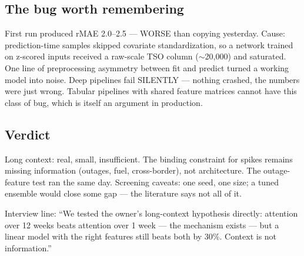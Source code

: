 \subsection{The bug worth remembering}

First run produced rMAE 2.0--2.5 --- WORSE than copying yesterday. Cause:
prediction-time samples skipped covariate standardization, so a network
trained on z-scored inputs received a raw-scale TSO column ($\sim$20{,}000)
and saturated. One line of preprocessing asymmetry between fit and
predict turned a working model into noise. Deep pipelines fail SILENTLY
--- nothing crashed, the numbers were just wrong. Tabular pipelines with
shared feature matrices cannot have this class of bug, which is itself
an argument in production.

\subsection{Verdict}

Long context: real, small, insufficient. The binding constraint for
spikes remains missing information (outages, fuel, cross-border), not
architecture. The outage-feature test ran the same day. Screening
caveats: one seed, one size; a tuned ensemble would close some gap ---
the literature says not all of it.

Interview line: ``We tested the owner's long-context hypothesis
directly: attention over 12 weeks beats attention over 1 week --- the
mechanism exists --- but a linear model with the right features still
beats both by 30\%. Context is not information.''
